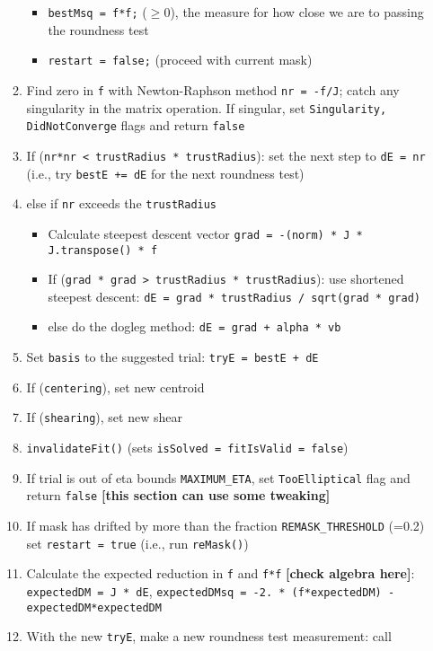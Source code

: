 \documentclass[useAMS,usenatbib,usegraphicx]{mn2e}
\begin{document}
\begin{enumerate}
\begin{enumerate}
\begin{itemize}
    \item {\tt bestMsq = f*f;} ($\geq0$), the measure for how close we are to passing the 
roundness test
    \item {\tt restart = false;} (proceed with current mask)
  \end{itemize}
  \item Find zero in {\tt f} with Newton-Raphson method {\tt nr = -f/J}; catch any singularity in 
the matrix operation. If singular, set {\tt Singularity, DidNotConverge} flags and return {\tt false}
  \item If ({\tt nr*nr < trustRadius * trustRadius}): set the next step to {\tt dE = nr}
(i.e., try {\tt bestE += dE} for the next roundness test)
  \item else if {\tt nr} exceeds the {\tt trustRadius}
    \begin{itemize}
    \item Calculate steepest descent vector {\tt grad = -(norm) * J * J.transpose() * f} %
    \item If ({\tt grad * grad > trustRadius * trustRadius}): use shortened steepest descent:
{\tt dE = grad * trustRadius / sqrt(grad * grad)}
    \item else do the dogleg method: {\tt dE = grad + alpha * vb}
    \end{itemize}
  \item Set {\tt basis} to the suggested trial: {\tt tryE = bestE + dE}
  \item If ({\tt centering}), set new centroid
  \item If ({\tt shearing}), set new shear
  \item {\tt invalidateFit()} (sets {\tt isSolved = fitIsValid = false})
  \item If trial is out of eta bounds {\tt MAXIMUM\_ETA}, set {\tt TooElliptical} flag
and return {\tt false} {\bf [this section can use some tweaking]} 
  \item If mask has drifted by more than the fraction {\tt REMASK\_THRESHOLD} (=0.2) set
{\tt restart = true} (i.e., run {\tt reMask()})
  \item Calculate the expected reduction in {\tt f} and {\tt f*f} {\bf [check algebra here]}: 
{\tt expectedDM = J * dE}, {\tt expectedDMsq = -2. * (f*expectedDM) - expectedDM*expectedDM}
  \item With the new {\tt tryE}, make a new roundness test measurement: call

\end{enumerate}
\end{enumerate}
\end{document}
